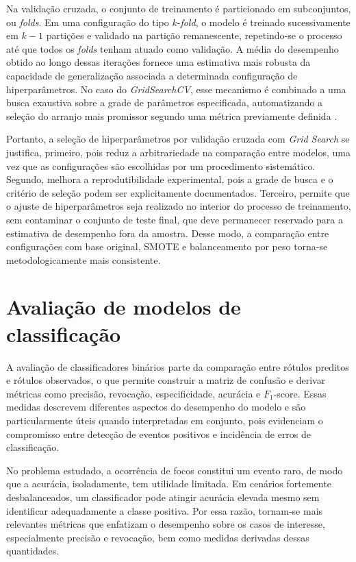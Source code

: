 Na validação cruzada, o conjunto de treinamento é particionado em subconjuntos, ou \textit{folds}. Em uma configuração do tipo $k$-\textit{fold}, o modelo é treinado sucessivamente em $k-1$ partições e validado na partição remanescente, repetindo-se o processo até que todos os \textit{folds} tenham atuado como validação. A média do desempenho obtido ao longo dessas iterações fornece uma estimativa mais robusta da capacidade de generalização associada a determinada configuração de hiperparâmetros. No caso do \textit{GridSearchCV}, esse mecanismo é combinado a uma busca exaustiva sobre a grade de parâmetros especificada, automatizando a seleção do arranjo mais promissor segundo uma métrica previamente definida \cite{sklearn2026gridsearchcv}.

Portanto, a seleção de hiperparâmetros por validação cruzada com \textit{Grid Search} se justifica, primeiro, pois reduz a arbitrariedade na comparação entre modelos, uma vez que as configurações são escolhidas por um procedimento sistemático. Segundo, melhora a reprodutibilidade experimental, pois a grade de busca e o critério de seleção podem ser explicitamente documentados. Terceiro, permite que o ajuste de hiperparâmetros seja realizado no interior do processo de treinamento, sem contaminar o conjunto de teste final, que deve permanecer reservado para a estimativa de desempenho fora da amostra. Desse modo, a comparação entre configurações com base original, SMOTE e balanceamento por peso torna-se metodologicamente mais consistente.

\section{Avaliação de modelos de classificação}
\label{sec:avaliacao_modelos}

A avaliação de classificadores binários parte da comparação entre rótulos preditos e rótulos observados, o que permite construir a matriz de confusão e derivar métricas como precisão, revocação, especificidade, acurácia e $F_1$-score. Essas medidas descrevem diferentes aspectos do desempenho do modelo e são particularmente úteis quando interpretadas em conjunto, pois evidenciam o compromisso entre detecção de eventos positivos e incidência de erros de classificação.

No problema estudado, a ocorrência de focos constitui um evento raro, de modo que a acurácia, isoladamente, tem utilidade limitada. Em cenários fortemente desbalanceados, um classificador pode atingir acurácia elevada mesmo sem identificar adequadamente a classe positiva. Por essa razão, tornam-se mais relevantes métricas que enfatizam o desempenho sobre os casos de interesse, especialmente precisão e revocação, bem como medidas derivadas dessas quantidades.

